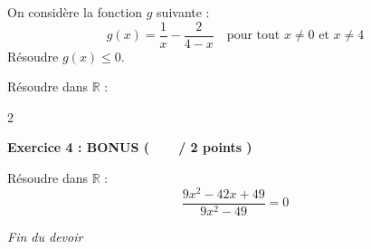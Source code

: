 \documentclass[12pt,a4paper]{exam}
\begin{document}
\begin{questions}

\question[1] On considère la fonction $g$ suivante :
\[
g(x) = \dfrac{1}{x} - \dfrac{2}{4-x} \quad \text{pour tout $x \neq 0$ et $x \neq 4$}
\]
Résoudre $g(x) \leq 0$.

\vspace{5pt}

\question[1] Résoudre dans $\mathbb{R}$ :
\begin{multicols}{2}
\end{multicols}

\end{questions}

\vspace{10pt}

\noindent
\textbf{Exercice 4 : BONUS (\ \ \ \  / 2 points )}
\vspace{5pt}

\begin{questions}

\question Résoudre dans $\mathbb{R}$ :
\[
\dfrac{9x^2-42x+49}{9x^2-49} = 0
\]

\end{questions}

\vspace{10pt}

\begin{center}
    \textit{Fin du devoir}
\end{center}
\end{document}
